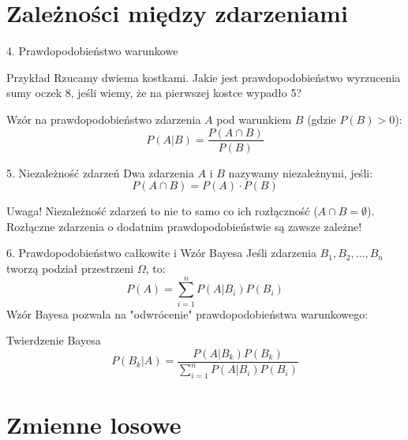 \documentclass{beamer}
\begin{document}
\section{Zależności między zdarzeniami}

\begin{frame}{4. Prawdopodobieństwo warunkowe}
\begin{exampleblock}{Przykład}
Rzucamy dwiema kostkami. Jakie jest prawdopodobieństwo wyrzucenia sumy oczek 8, jeśli wiemy, że na pierwszej kostce wypadło 5?
\end{exampleblock}
Wzór na prawdopodobieństwo zdarzenia $A$ pod warunkiem $B$ (gdzie $P(B)>0$):
\begin{equation}
P(A|B) = \frac{P(A \cap B)}{P(B)}
\end{equation}
\end{frame}

\begin{frame}{5. Niezależność zdarzeń}
Dwa zdarzenia $A$ i $B$ nazywamy niezależnymi, jeśli:
\begin{equation}
P(A \cap B) = P(A) \cdot P(B)
\end{equation}
\vspace{0.5cm}
\begin{alertblock}{Uwaga!}
Niezależność zdarzeń to nie to samo co ich rozłączność ($A \cap B = \emptyset$). Rozłączne zdarzenia o dodatnim prawdopodobieństwie są zawsze zależne!
\end{alertblock}
\end{frame}

\begin{frame}{6. Prawdopodobieństwo całkowite i Wzór Bayesa}
Jeśli zdarzenia $B_1, B_2, \dots, B_n$ tworzą podział przestrzeni $\Omega$, to:
\begin{equation}
P(A) = \sum_{i=1}^n P(A|B_i)P(B_i)
\end{equation}
Wzór Bayesa pozwala na "odwrócenie" prawdopodobieństwa warunkowego:
\begin{block}{Twierdzenie Bayesa}
\begin{equation}
P(B_k|A) = \frac{P(A|B_k)P(B_k)}{\sum_{i=1}^n P(A|B_i)P(B_i)}
\end{equation}
\end{block}
\end{frame}

\section{Zmienne losowe}
\end{document}
